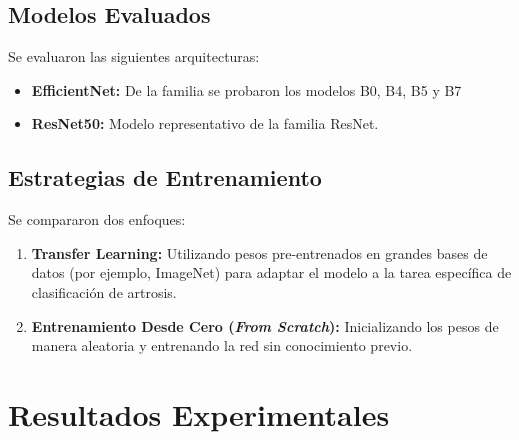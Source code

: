 \documentclass[11pt,spanish,listoffigures,listoftables]{tfgetsinf}
\begin{document}
\subsection{Modelos Evaluados}
Se evaluaron las siguientes arquitecturas:
\begin{itemize}
    \item \textbf{EfficientNet:} De la familia se probaron los modelos B0, B4, B5 y B7
    \item \textbf{ResNet50:} Modelo representativo de la familia ResNet.
\end{itemize}

\subsection{Estrategias de Entrenamiento}
Se compararon dos enfoques:
\begin{enumerate}
    \item \textbf{Transfer Learning:} Utilizando pesos pre-entrenados en grandes bases de datos (por ejemplo, ImageNet) para adaptar el modelo a la tarea específica de clasificación de artrosis.
    \item \textbf{Entrenamiento Desde Cero (\textit{From Scratch}):} Inicializando los pesos de manera aleatoria y entrenando la red sin conocimiento previo.
\end{enumerate}

\section{Resultados Experimentales}
\end{document}
